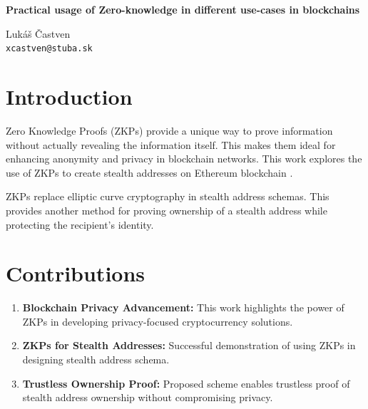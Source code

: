\documentclass[portrait]{poster}
\begin{document}
\printheader

\begin{center}
    \textbf{\bf\veryHuge\color{NavyBlue}Practical usage of Zero-knowledge in different use-cases in blockchains\\[1.5cm]}

    \huge     Lukáš Častven \\[0.2cm]
    \Large    \texttt{xcastven@stuba.sk}
\end{center}

\vspace{2cm}

\Large

\begin{multicols}{2}

\section*{Introduction}

    Zero Knowledge Proofs (ZKPs) provide a unique way to prove information without
    actually revealing the information itself\cite{Goldwasser1989, goldreich1991proofs}.
    This makes them ideal for
    enhancing anonymity and privacy in blockchain networks. This work
    explores the use of ZKPs to create stealth addresses on Ethereum blockchain
    \cite{ButerinIncompleteGuide}.

    ZKPs replace elliptic curve cryptography in stealth address schemas.
    This provides another method for proving ownership of a stealth
    address while protecting the recipient's identity.

\section*{Contributions}

    \begin{enumerate}
        \item \textbf{Blockchain Privacy Advancement:} This work highlights the power
            of ZKPs in developing privacy-focused cryptocurrency solutions.
        \item \textbf{ZKPs for Stealth Addresses:} Successful demonstration of using
            ZKPs in designing stealth address schema.
        \item \textbf{Trustless Ownership Proof: } Proposed scheme enables trustless
            proof of stealth address ownership without compromising privacy.
    \end{enumerate}


\end{multicols}
\end{document}
